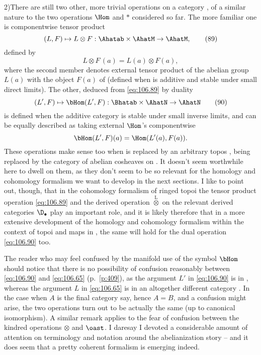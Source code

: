 \begin{remarks}
  2)\enspace There are still two other, more trivial operations on a
  category \Ahat, of a similar nature to the two operations $\Hom$
  and $*$ considered so far. The more familiar one is componentwise
  tensor product
  \begin{equation}
    \label{eq:106.89}
    (L,F)\mapsto L\otimes F: \Ahatab\times\AhatM\to\AhatM,\tag{89}
  \end{equation}
  defined by
  \[{L\otimes F}\,(a) = L(a)\otimes F(a),\]
  where the second member denotes external tensor product of the
  abelian group $L(a)$ with the object $F(a)$ of \scrM{} (defined when
  \scrM{} is additive and stable under small direct limits). The
  other, deduced from \eqref{eq:106.89} by duality
  \begin{equation}
    \label{eq:106.90}
    (L',F)\mapsto\bHom(L',F) : \Bhatab\times\AhatN\to\AhatN\tag{90}
  \end{equation}
  is defined when the additive category \scrN{} is stable under small
  inverse limits, and can be equally described as taking external
  $\Hom$'s componentwise
  \[\bHom(L',F)(a) = \Hom(L'(a),F(a)).\]
  These operations make sense too when \Ahat{} is replaced by an
  arbitrary topos \scrA, \Bhatab{} being replaced by the category of
  abelian cosheaves on \scrA. It doesn't seem worthwhile here to dwell
  on them, as they don't seem to be so relevant for the homology and
  cohomology formalism we want to develop in the next sections. I like
  to point out, though, that in the cohomology formalism of ringed
  topoi the tensor product operation \eqref{eq:106.89} and the derived
  operation $\overset{\mathrm L}{\otimes}$ on the relevant derived
  categories $\D_\bullet$ play an important role, and it is likely
  therefore that in a more extensive development of the homology and
  cohomology formalism within the context of topoi \Ahat{} and maps in
  \Cat, the same will hold for the dual operation \eqref{eq:106.90}
  too.

  The reader who may feel confused by the manifold use of the symbol
  $\bHom$ should notice that there is no possibility of confusion
  reasonably between \eqref{eq:106.90} and \eqref{eq:106.65} (p.\
  \ref{p:409}), as the argument $L'$ in \eqref{eq:106.90} is in
  \Bhatab, whereas the argument $L$ in \eqref{eq:106.65} is in an
  altogether different category \Ahatab. In the case when $A$ is the
  final category say, hence $A=B$, and a confusion might arise, the
  two operations turn out to be actually the same (up to canonical
  isomorphism). A similar remark applies to the fear of confusion
  between the kindred operations $\otimes$ and $\oast$. I daresay I
  devoted a considerable amount of attention on terminology and
  notation around the abelianization story -- and it does seem that a
  pretty coherent formalism is emerging indeed.
\end{remarks}

